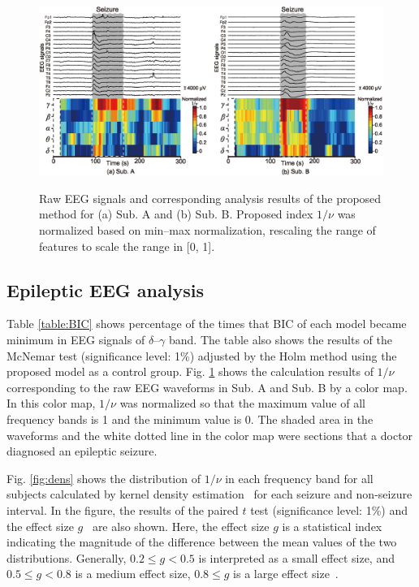 \documentclass[journal]{IEEEtran}
\begin{document}
\begin{figure}[!ht]　%
\centering
\includegraphics[width=0.9\hsize]{figure/Colormap_ver4_2.eps}
\caption{Raw EEG signals and corresponding analysis results of the proposed method for (a) Sub. A and (b) Sub. B. Proposed index $1/\nu$ was normalized based on min--max normalization, rescaling the range of features to scale the range in [0, 1].  }
\label{fig:Colormap}
\end{figure}
\subsection{Epileptic EEG analysis}
Table \ref{table:BIC} shows percentage of the times that BIC of each model became minimum in EEG signals of $\delta$--$\gamma$ band.
The table also shows the results of the McNemar test (significance level: 1\%) adjusted by the Holm method using the proposed model as a control group.
Fig. \ref{fig:Colormap} shows the calculation results of $1/\nu$ corresponding to the raw EEG waveforms in Sub. A and Sub. B by a color map.
In this color map, $1/\nu$ was normalized so that the maximum value of all frequency bands is 1 and the minimum value is 0.
The shaded area in the waveforms and the white dotted line in the color map were sections that a doctor diagnosed an epileptic seizure.

Fig. \ref{fig:dens} shows the distribution of $1/\nu$ in each frequency band for all subjects calculated by kernel density estimation~\cite{Parzen1962} for each seizure and non-seizure interval.
In the figure, the results of the paired $t$ test (significance level: 1\%) and the effect size $g$~\cite{Hedges1981} are also shown.
Here, the effect size $g$ is a statistical index indicating the magnitude of the difference between the mean values of the two distributions. Generally, $0.2 \leq g < 0.5$ is interpreted as a small effect size, and $0.5 \leq g < 0.8$ is a medium effect size, $0.8 \leq g$ is a large effect size~\cite{Cohen2013}.
\end{document}
